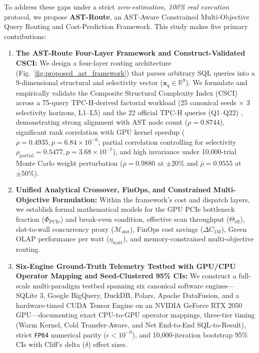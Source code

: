 \documentclass[10pt,a4paper]{article}
\begin{document}
To address these gaps under a strict \emph{zero-estimation, 100\% real execution} protocol, we propose \textbf{AST-Route}, an AST-Aware Constrained Multi-Objective Query Routing and Cost-Prediction Framework. This study makes five primary contributions:
\begin{enumerate}[leftmargin=1.5em,itemsep=2pt]
    \item \textbf{The AST-Route Four-Layer Framework and Construct-Validated CSCI:} We design a four-layer routing architecture (Fig.~\ref{fig:proposed_ast_framework}) that parses arbitrary SQL queries into a 9-dimensional structural and selectivity vector ($\mathbf{x}_q \in \mathbb{R}^9$). We formulate and empirically validate the Composite Structural Complexity Index ($\text{CSCI}$) across a 75-query TPC-H-derived factorial workload (25 canonical seeds $\times$ 3 selectivity horizons, L1--L5) and the 22 official TPC-H queries (Q1--Q22) \cite{tpc2022tpch}, demonstrating strong alignment with AST node count ($\rho=0.8744$), significant rank correlation with GPU kernel speedup ($\rho=0.4935, p=6.84\times 10^{-6}$; partial correlation controlling for selectivity $\rho_{\text{partial}}=0.5477, p=3.68\times 10^{-7}$), and high invariance under 10,000-trial Monte Carlo weight perturbation ($\bar{\rho}=0.9880$ at $\pm 20\%$ and $\bar{\rho}=0.9555$ at $\pm 50\%$).
    \item \textbf{Unified Analytical Crossover, FinOps, and Constrained Multi-Objective Formulation:} Within the framework's cost and dispatch layers, we establish formal mathematical models for the GPU PCIe bottleneck fraction ($\Phi_{\text{PCIe}}$) and break-even condition, effective scan throughput ($\Theta_{\text{eff}}$), slot-to-wall concurrency proxy ($\mathcal{M}_{\text{slot}}$), FinOps cost savings ($\Delta C_{\text{1M}}$), Green OLAP performance per watt ($\eta_{\text{watt}}$), and memory-constrained multi-objective routing.
    \item \textbf{Six-Engine Ground-Truth Telemetry Testbed with GPU/CPU Operator Mapping and Seed-Clustered 95\% CIs:} We construct a full-scale multi-paradigm testbed spanning six canonical software engines---SQLite 3, Google BigQuery, DuckDB, Polars, Apache DataFusion, and a hardware-timed CUDA Tensor Engine on an NVIDIA GeForce RTX 2050 GPU---documenting exact CPU-to-GPU operator mappings, three-tier timing (Warm Kernel, Cold Transfer-Aware, and Net End-to-End SQL-to-Result), strict \texttt{FP64} numerical parity ($\epsilon < 10^{-9}$), and 10,000-iteration bootstrap 95\% CIs with Cliff's delta ($\delta$) effect sizes.

\end{enumerate}
\end{document}
